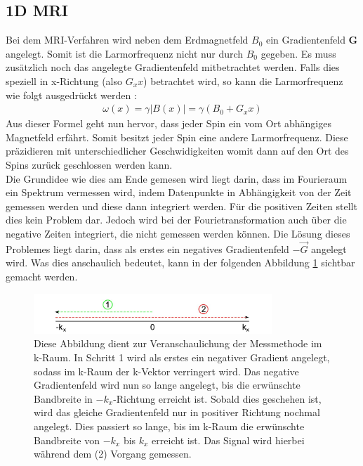 \subsection{1D MRI}
\label{sec:1DMRIkapitel}
Bei dem MRI-Verfahren wird neben dem Erdmagnetfeld $B_0$ ein Gradientenfeld \textbf{G} angelegt.
Somit ist die Larmorfrequenz nicht nur durch $B_0$ gegeben.
Es muss zusätzlich noch das angelegte Gradientenfeld mitbetrachtet werden.
Falls dies speziell in x-Richtung (also $G_xx$) betrachtet wird, so kann die Larmorfrequenz wie folgt ausgedrückt werden \cite{Schmidt}:
\begin{align}
    \omega(x)=\gamma |B(x)|= \gamma \left(B_0+G_xx\right) \label{eq:gradientlarmor}
\end{align}
Aus dieser Formel geht nun hervor, dass jeder Spin ein vom Ort abhängiges Magnetfeld erfährt.
Somit besitzt jeder Spin eine andere Larmorfrequenz.
Diese präzidieren mit unterschiedlicher Geschwidigkeiten womit dann auf den Ort des Spins zurück geschlossen werden kann. \\

Die Grundidee wie dies am Ende gemesen wird liegt darin, dass im Fourieraum ein Spektrum vermessen wird, indem Datenpunkte in Abhängigkeit von der Zeit gemessen werden und diese dann integriert werden.
Für die positiven Zeiten stellt dies kein Problem dar.
Jedoch wird bei der Fourietransformation auch über die negative Zeiten integriert, die nicht gemessen werden können.
Die Lösung dieses Problemes liegt darin, dass als erstes ein negatives Gradientenfeld $-\vec{G}$ angelegt wird.
Was dies anschaulich bedeutet, kann in der folgenden Abbildung \ref{fig:1DMRI} sichtbar gemacht werden.  
\begin{figure}[H]
    \centering
    \includegraphics[width=0.8\textwidth]{Abbildungen/1DMRIkraum.JPG}
    \caption[Veranschaulichter Verlauf des k-Vektors im 1D-MRI]{Diese Abbildung dient zur Veranschaulichung der Messmethode im k-Raum.
    In Schritt 1 wird als erstes ein negativer Gradient angelegt, sodass im k-Raum der k-Vektor verringert wird.
    Das negative Gradientenfeld wird nun so lange angelegt, bis die erwünschte Bandbreite in $-k_{x}$-Richtung erreicht ist.
    Sobald dies geschehen ist, wird das gleiche Gradientenfeld nur in positiver Richtung nochmal angelegt.
    Dies passiert so lange,  bis im k-Raum die erwünschte Bandbreite von $-k_{x}$ bis $k_{x}$ erreicht ist.
    Das Signal wird hierbei während dem (2) Vorgang gemessen. \cite{Schmidt}}
    \label{fig:1DMRI}
\end{figure}


